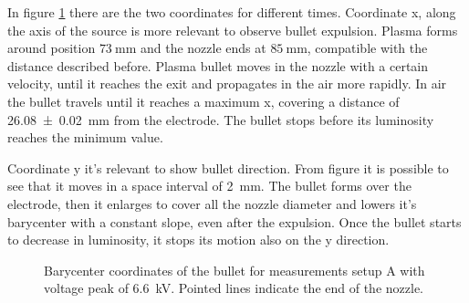 In figure \ref{fig:elio_d035_bary} there are the two coordinates for different times.
Coordinate x, along the axis of the source is more relevant to observe bullet expulsion. Plasma forms around position $\SI{73}{\milli\meter}$ and the nozzle ends at $\SI{85}{\milli\meter}$, compatible with the distance described before. Plasma bullet moves in the nozzle with a certain velocity, until it reaches the exit and propagates in the air more rapidly. In air the bullet travels until it reaches a maximum x, covering a distance of \SI{26.08(2)}{\milli\meter} from the electrode. The bullet stops before its luminosity reaches the minimum value.

Coordinate y it's relevant to show bullet direction. From figure it is possible to see that  it moves in a space interval of \SI{2}{\milli\meter}. The bullet forms over the electrode, then it enlarges to cover all the nozzle diameter and lowers it's barycenter with a constant slope, even after the expulsion. Once the bullet starts to decrease in luminosity, it stops its motion also on the y direction.
\begin{figure}
 \centering
 \hfill
 \caption{Barycenter coordinates of the bullet for measurements setup A with voltage peak of \SI{6.6}{\kilo\volt}. Pointed lines indicate the end of the nozzle.}
 \label{fig:elio_d035_bary}
\end{figure}

